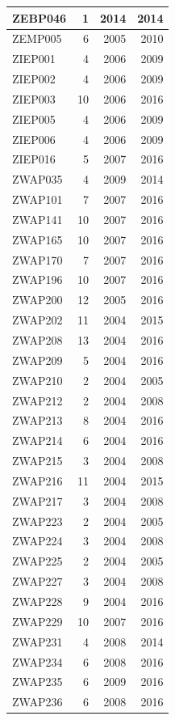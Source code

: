 \documentclass[11pt,]{book}
\begin{document}
\begin{table}
\begin{tabular}[t]{l|r|r|r}
\hline
ZEBP046 & 1 & 2014 & 2014\\
\hline
ZEMP005 & 6 & 2005 & 2010\\
\hline
ZIEP001 & 4 & 2006 & 2009\\
\hline
ZIEP002 & 4 & 2006 & 2009\\
\hline
ZIEP003 & 10 & 2006 & 2016\\
\hline
ZIEP005 & 4 & 2006 & 2009\\
\hline
ZIEP006 & 4 & 2006 & 2009\\
\hline
ZIEP016 & 5 & 2007 & 2016\\
\hline
ZWAP035 & 4 & 2009 & 2014\\
\hline
ZWAP101 & 7 & 2007 & 2016\\
\hline
ZWAP141 & 10 & 2007 & 2016\\
\hline
ZWAP165 & 10 & 2007 & 2016\\
\hline
ZWAP170 & 7 & 2007 & 2016\\
\hline
ZWAP196 & 10 & 2007 & 2016\\
\hline
ZWAP200 & 12 & 2005 & 2016\\
\hline
ZWAP202 & 11 & 2004 & 2015\\
\hline
ZWAP208 & 13 & 2004 & 2016\\
\hline
ZWAP209 & 5 & 2004 & 2016\\
\hline
ZWAP210 & 2 & 2004 & 2005\\
\hline
ZWAP212 & 2 & 2004 & 2008\\
\hline
ZWAP213 & 8 & 2004 & 2016\\
\hline
ZWAP214 & 6 & 2004 & 2016\\
\hline
ZWAP215 & 3 & 2004 & 2008\\
\hline
ZWAP216 & 11 & 2004 & 2015\\
\hline
ZWAP217 & 3 & 2004 & 2008\\
\hline
ZWAP223 & 2 & 2004 & 2005\\
\hline
ZWAP224 & 3 & 2004 & 2008\\
\hline
ZWAP225 & 2 & 2004 & 2005\\
\hline
ZWAP227 & 3 & 2004 & 2008\\
\hline
ZWAP228 & 9 & 2004 & 2016\\
\hline
ZWAP229 & 10 & 2007 & 2016\\
\hline
ZWAP231 & 4 & 2008 & 2014\\
\hline
ZWAP234 & 6 & 2008 & 2016\\
\hline
ZWAP235 & 6 & 2009 & 2016\\
\hline
ZWAP236 & 6 & 2008 & 2016\\

\end{tabular}
\end{table}
\end{document}

